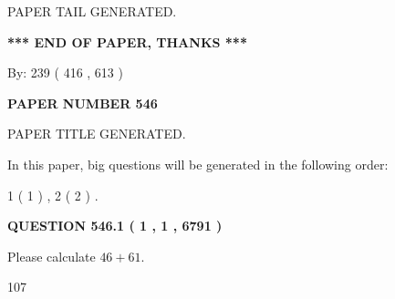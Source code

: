 \documentclass[12pt]{article}
\begin{document}
   
   
\vspace{2.0in} PAPER TAIL GENERATED.
   
   
   
   
\vspace{1.0in} 
{\textbf{\large{ *** END OF PAPER, THANKS *** }}} 
   
   
\hspace{1.0in} By: 
 239 ( 416 ,  613 )
   
   
   
   
\newpage 
\setcounter{page}{ 
   546001 } 
   
   
   
   
 {\textbf{ \Large{ PAPER NUMBER  546  }}}
   
   
\vspace{0.2in}
   
   
   
   
   
   
   
   
 \vspace{0.2in}
 
 
 
 
   
   
 PAPER TITLE GENERATED.
   
   
   
\vspace{0.2in}
   
In this paper, big questions will be generated in the following order: 
   
   
   1 ( 1 )
 ,
   2 ( 2 )
 .
  
\vspace{0.2in}
  
{\textbf{\Large{QUESTION
546.1 
 ( 1 , 1 , 6791 )
}}}
  
  
 
Please calculate $ %
46 +  %
61 $.
 
 
 
\noindent{}
 
 

107
 
 
\noindent{}
 
 

 
 
 
\noindent{}
 
\end{document}
